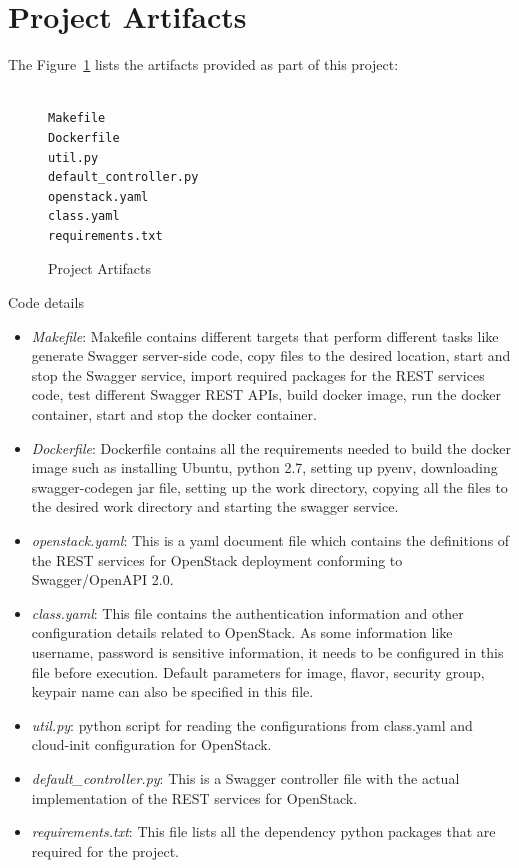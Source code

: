 \section{Project Artifacts}

The Figure~\ref{c:project-artifacts} lists the artifacts provided as part of
this project:
\begin{figure}[htb]
\begin{verbatim}

Makefile
Dockerfile
util.py
default_controller.py
openstack.yaml
class.yaml
requirements.txt
\end{verbatim}
\caption{Project Artifacts}\label{c:project-artifacts}
\end{figure}

Code details
\begin{itemize}

\item \textit{Makefile}: Makefile contains different targets that perform
different tasks like generate Swagger server-side code, copy files to the
desired location, start and stop the Swagger service, import required packages
for the REST services code, test different Swagger REST APIs, build docker
image, run the docker container, start and stop the docker container.

\item \textit{Dockerfile}: Dockerfile contains all the requirements needed to
build the docker image such as installing Ubuntu, python 2.7, setting up pyenv,
downloading swagger-codegen jar file, setting up the work directory, copying 
all the files to the desired work directory and starting the swagger service. 

\item \textit{openstack.yaml}: This is a yaml document file which contains the
definitions of the REST services for OpenStack deployment conforming to
Swagger/OpenAPI 2.0.

\item \textit{class.yaml}: This file contains the authentication information 
and other configuration details related to OpenStack. As some information like
username, password is sensitive information, it needs to be
configured in this file before execution. Default parameters for image, flavor,
security group, keypair name can also be specified in this file.

\item \textit{util.py}: python script for reading the configurations from
class.yaml and cloud-init configuration for OpenStack.

\item \textit{default\_controller.py}: This is a Swagger controller file with
the actual implementation of the REST services for OpenStack.

\item \textit{requirements.txt}: This file lists all the dependency python
packages that are required for the project.
\end{itemize}

